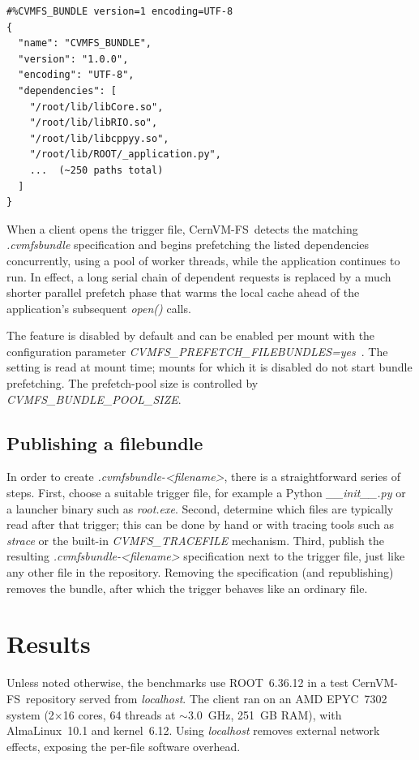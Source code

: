 \documentclass{webofc}
\newcommand{\cvmfs}{CernVM-FS}
\begin{document}
\begin{lstlisting}[style=bundle]
#%CVMFS_BUNDLE version=1 encoding=UTF-8
{
  "name": "CVMFS_BUNDLE",
  "version": "1.0.0",
  "encoding": "UTF-8",
  "dependencies": [
    "/root/lib/libCore.so",
    "/root/lib/libRIO.so",
    "/root/lib/libcppyy.so",
    "/root/lib/ROOT/_application.py",
    ...  (~250 paths total)
  ]
}
\end{lstlisting}

When a client opens the trigger file, \cvmfs\ detects the matching
\emph{.cvmfsbundle} specification and begins prefetching the listed
dependencies concurrently, using a pool of worker threads, while the
application continues to run. In effect, a long serial chain of
dependent requests is replaced by a much shorter parallel prefetch
phase that warms the local cache ahead of the application's subsequent
\emph{open()} calls.

The feature is disabled by default and can be enabled per mount with the configuration parameter
\emph{CVMFS\_PREFETCH\_FILEBUNDLES=yes}~\cite{ref-docs}. The setting
is read at mount time; mounts for which it is disabled do not start
bundle prefetching. The prefetch-pool size is controlled by
\emph{CVMFS\_BUNDLE\_POOL\_SIZE}.

\subsection{Publishing a filebundle}
\label{sec-publish}

In order to create \emph{.cvmfsbundle-<filename>}, there is a straightforward series of steps.
First, choose a suitable trigger file, for example a Python
\emph{\_\_init\_\_.py} or a launcher binary such as
\emph{root.exe}. Second, determine which files are typically read
after that trigger; this can be done by hand or with tracing tools such
as \emph{strace} or the built-in \emph{CVMFS\_TRACEFILE}
mechanism. Third, publish the resulting \emph{.cvmfsbundle-<filename>}
specification next to the trigger file, just like any other file in the
repository. Removing the specification (and republishing) removes the
bundle, after which the trigger behaves like an ordinary file.

\section{Results}
\label{sec-results}

Unless noted otherwise, the benchmarks use ROOT~6.36.12 in a test
\cvmfs\ repository served from \emph{localhost}. The client ran on
an AMD EPYC~7302 system (2$\times$16 cores, 64 threads at
${\sim}3.0$~GHz, 251~GB RAM), with AlmaLinux~10.1 and kernel~6.12.
Using \emph{localhost} removes external network effects, exposing the
per-file software overhead.
\end{document}
